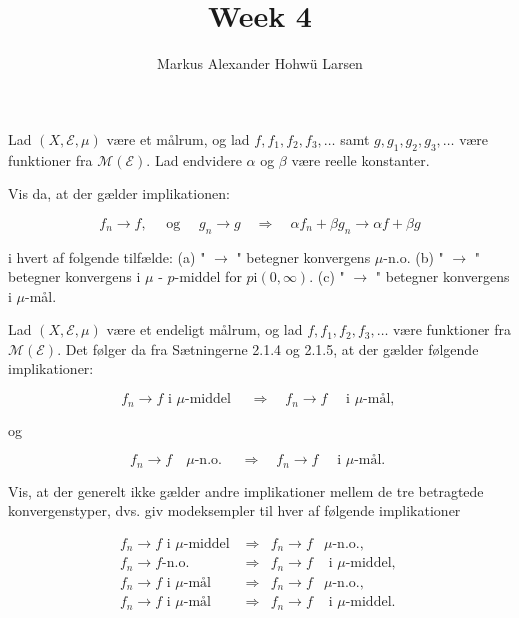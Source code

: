 \documentclass{Class}
\title{Week 4}
\author{Markus Alexander Hohwü Larsen}
\begin{document}
Lad $(X, \mathcal{E}, \mu)$ være et målrum, og lad $f, f_1, f_2, f_3, \dots$ samt $g, g_1, g_2, g_3, \dots$ være funktioner fra $\mathcal{M}(\mathcal{E})$. Lad endvidere $\alpha$ og $\beta$ være reelle konstanter.

Vis da, at der gælder implikationen:

$$
f_n \rightarrow f, \quad \text { og } \quad g_n \rightarrow g \quad \Longrightarrow \quad \alpha f_n+\beta g_n \rightarrow \alpha f+\beta g
$$

i hvert af folgende tilfælde:
(a) " $\rightarrow$ " betegner konvergens $\mu$-n.o.
(b) " $\rightarrow$ " betegner konvergens i $\mu$ - $p$-middel for $p \mathrm{i}(0, \infty)$.
(c) " $\rightarrow$ " betegner konvergens i $\mu$-mål.
\solution







Lad $(X, \mathcal{E}, \mu)$ være et endeligt målrum, og lad $f, f_1, f_2, f_3, \dots$ være funktioner fra $\mathcal{M}(\mathcal{E})$. Det følger da fra Sætningerne 2.1.4 og 2.1.5, at der gælder følgende implikationer:

\begin{equation}
    f_n \rightarrow f \text { i } \mu \text {-middel } \quad \Longrightarrow \quad f_n \rightarrow f \quad \text { i } \mu \text {-mål, }
\end{equation}

og

\begin{equation}
    f_n \rightarrow f \quad \mu \text {-n.o. } \quad \Longrightarrow \quad f_n \rightarrow f \quad \text { i } \mu \text {-mål. }
\end{equation}


Vis, at der generelt ikke gælder andre implikationer mellem de tre betragtede konvergenstyper, dvs. giv modeksempler til hver af følgende implikationer


\begin{align}
f_n \rightarrow f \text { i } \mu \text {-middel } & \Longrightarrow & f_n \rightarrow f & \mu \text {-n.o., } \\
f_n \rightarrow f \text {-n.o. } & \Longrightarrow & f_n \rightarrow f & \text { i } \mu \text {-middel, } \\
f_n \rightarrow f \text { i } \mu \text {-mål } & \Longrightarrow & f_n \rightarrow f & \mu \text {-n.o., } \\
f_n \rightarrow f \text { i } \mu \text {-mål } & \Longrightarrow & f_n \rightarrow f & \text { i } \mu \text {-middel. }
\end{align}
\end{document}
